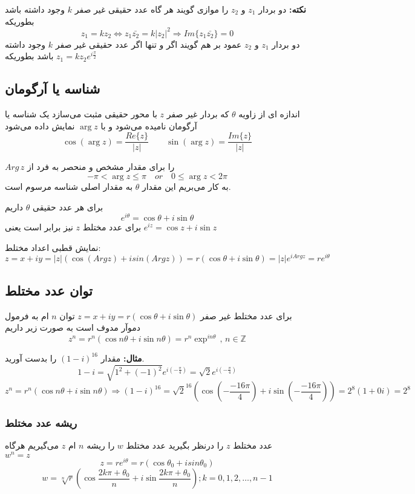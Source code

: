 \documentclass[12pt]{report}
\begin{document}
	\textbf{نکته:}
	دو بردار 
	$z_1$
	و
	$z_2$
	را موازی گویند هر گاه عدد حقیقی غیر صفر 
	$k$
	وجود داشته باشد بطوریکه
	$$z_1 = kz_2 \Leftrightarrow z_1 \bar{z_2} = k |z_2|^2 \Rightarrow Im\{z_1 \bar{z_2}\}= 0$$
	دو بردار 
	$z_1$
	و 
	$z_2$
	عمود بر هم گویند اگر و تنها اگر عدد حقیقی غیر صفر 
	$k$
	وجود داشته باشد بطوریکه
	$z_1 = k z_2 e^{i\frac{\pi}{2}}$
	
	\subsection{شناسه یا آرگومان}
	اندازه ای از زاویه
	$\theta$
	که بردار غیر صفر
	$z$
	با محور حقیقی مثبت می‌سازد یک شناسه یا آرگومان نامیده می‌شود و با
	$\arg{z}$
	نمایش داده می‌شود
	$$\cos (\arg z) = \frac{Re\{z\}}{|z|} \qquad \sin(\arg z) = \frac{Im\{z\}}{|z|}$$
	
	$Arg \, z$
	را برای مقدار مشخص و منحصر به فرد از
	$$-\pi < \arg z \leq \pi \quad or \quad 0\leq  \arg z < 2\pi$$
	به کار می‌بریم این مقدار 
	$\theta$
	به مقدار اصلی شناسه مرسوم است.
	
	برای هر عدد حقیقی 
	$\theta$
	داریم
	$$e^{i \theta} = \cos \theta + i \sin \theta$$
	برای عدد مختلط
	$z$
	 نیز برابر است یعنی
	 $e^{iz} = \cos z + i \sin z$
	 
	 نمایش قطبی اعداد مختلط:
	 $$z = x +iy = |z|(\cos (Arg z) + i sin(Arg z)) = r (\cos \theta + i \sin \theta) = |z|e^{iArg z} = re^{i\theta}$$
	 
	 \subsection{توان عدد مختلط}
	 برای عدد مختلط غیر صفر
	 $z = x + iy = r(\cos \theta + i \sin \theta)$
	 توان 
	 $n$
	 ام
	 به فرمول دموآر مدوف است به صورت زیر داریم
	 $$z^n = r^n(\cos n\theta + i \sin n\theta) = r^n \exp^{in\theta} \,,\, n \in \mathbb{Z}$$
	 
	 \textbf{مثال:}
	 مقدار 
	 $(1 - i)^{16}$
	 را بدست آورید.
	 $$1 - i = \sqrt{1^2 + (-1)^2} e^{i (-\frac{\pi}{4})} = \sqrt{2}e^{i (-\frac{\pi}{4})}$$
	 $$z^n = r^n(\cos n \theta + i\sin n\theta) \Rightarrow (1 - i)^{16} = \sqrt{2}^{16} (\cos (-\frac{-16 \pi}{4}) + i \sin (-\frac{-16 \pi}{4})) = 2^8(1+ 0i) = 2^8$$
	 \subsubsection{ریشه عدد مختلط}
	 عدد مختلط 
	 $z$
	 را درنظر بگیرید عدد مختلط 
	 $w$
	 را ریشه 
	 $n$
	 ام 
	 $z$
	 می‌گیریم هرگاه
	 $w^n = z\qquad$
	 $$z = re^{i \theta} = r(\cos \theta_0 + i sin \theta_0) $$
	 $$ w = \sqrt[n]{r}(\cos \frac{2k\pi + \theta_0}{n} + i \sin \frac{2k\pi + \theta_0}{n}) ; k = 0, 1, 2, \dots, n -1 $$
	 
\end{document}
